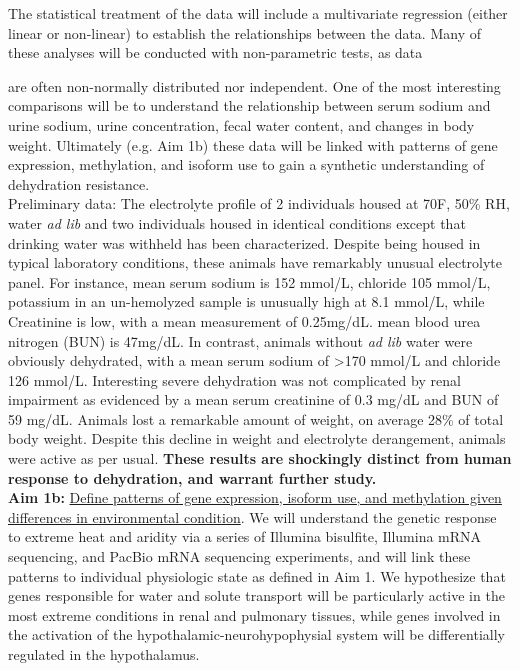 \documentclass[12pt]{article}
\begin{document}
The statistical treatment of the data will include a multivariate regression (either linear or non-linear) to establish the relationships between the data. Many of these analyses will be conducted with non-parametric tests, as data 


\noindent are often non-normally distributed nor independent. One of the most interesting comparisons will be to understand the relationship between serum sodium and urine sodium, urine concentration, fecal water content, and changes in body weight. Ultimately (e.g. Aim 1b) these data will be linked with patterns of gene expression, methylation, and isoform use to gain a synthetic understanding of dehydration resistance. \\




%
%


Preliminary data: The electrolyte profile of 2 individuals housed at 70F, 50\% RH, water \textit{ad lib} and two individuals housed in identical conditions except that drinking water was withheld has been characterized. Despite being housed in typical laboratory conditions, these animals have remarkably unusual electrolyte panel. For instance, mean serum sodium is 152 mmol/L, chloride 105 mmol/L, potassium in an un-hemolyzed sample is unusually high at 8.1 mmol/L, while Creatinine is low, with a mean measurement of 0.25mg/dL. mean blood urea nitrogen (BUN) is 47mg/dL. In contrast, animals without \textit{ad lib} water were obviously dehydrated, with a mean serum sodium of \textgreater 170 mmol/L and chloride 126 mmol/L. Interesting severe dehydration was not complicated by renal impairment as evidenced by a mean serum creatinine of 0.3 mg/dL and BUN of 59 mg/dL. Animals lost a remarkable amount of weight, on average 28\% of total body weight. Despite this decline in weight and electrolyte derangement, animals were active as per usual. \textbf{These results are shockingly distinct from human response to dehydration, and warrant further study.}  \\  

\noindent \textbf{Aim 1b:} \ul{Define patterns of gene expression, isoform use, and methylation given differences in environmental condition}. {We will understand the genetic response to extreme heat and aridity via a series of Illumina bisulfite, Illumina mRNA sequencing, and PacBio mRNA sequencing experiments, and will link these patterns to individual physiologic state as defined in Aim 1.} We hypothesize that genes responsible for water and solute transport will be particularly active in the most extreme conditions in renal and pulmonary tissues, while genes involved in the activation of the hypothalamic-neurohypophysial system will be differentially regulated in the hypothalamus.\\
\end{document}
